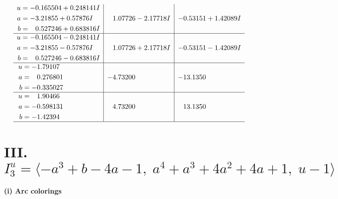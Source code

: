 \documentclass[1p]{elsarticle_modified}
\theoremstyle{definition}
\begin{document}
$$\begin{array}{c|c|c}
\begin{aligned}
u &= -0.165504 + 0.248141 I \\
a &= -3.21855 + 0.57876 I \\
b &= \phantom{-}0.527246 + 0.683816 I\end{aligned}
 & \phantom{-}1.07726 - 2.17718 I & -0.53151 + 1.42089 I \\ \hline\begin{aligned}
u &= -0.165504 - 0.248141 I \\
a &= -3.21855 - 0.57876 I \\
b &= \phantom{-}0.527246 - 0.683816 I\end{aligned}
 & \phantom{-}1.07726 + 2.17718 I & -0.53151 - 1.42089 I \\ \hline\begin{aligned}
u &= -1.79107\phantom{ +0.000000I} \\
a &= \phantom{-}0.276801\phantom{ +0.000000I} \\
b &= -0.335027\phantom{ +0.000000I}\end{aligned}
 & -4.73200\phantom{ +0.000000I} & -13.1350\phantom{ +0.000000I} \\ \hline\begin{aligned}
u &= \phantom{-}1.90466\phantom{ +0.000000I} \\
a &= -0.598131\phantom{ +0.000000I} \\
b &= -1.42394\phantom{ +0.000000I}\end{aligned}
 & \phantom{-}4.73200\phantom{ +0.000000I} & \phantom{-}13.1350\phantom{ +0.000000I}\\
 \hline 
 \end{array}$$\newpage\newpage\renewcommand{\arraystretch}{1}
\centering \section*{III. $I^u_{3}= \langle - a^3+b-4 a-1,\;a^4+a^3+4 a^2+4 a+1,\;u-1 \rangle$}
\flushleft \textbf{(i) Arc colorings}\\
\end{document}
